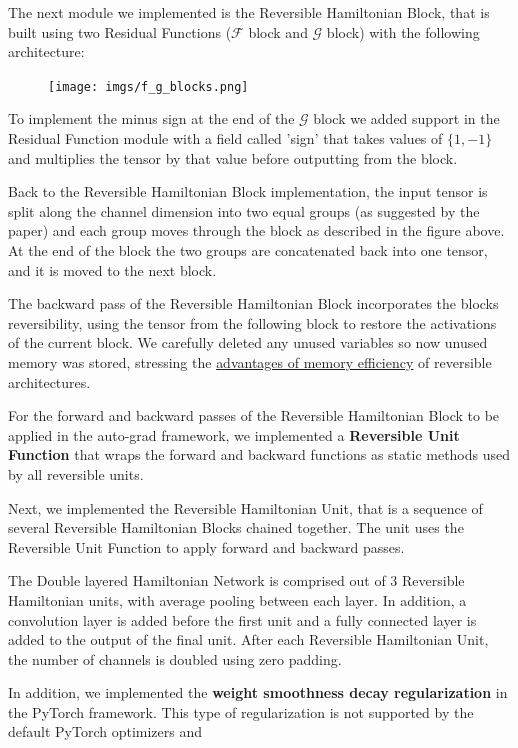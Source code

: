 \documentclass{article}
\theoremstyle{remark}
\begin{document}
The next module we implemented is the Reversible Hamiltonian Block, that is built using two Residual Functions ($\mathcal{F}$ block and $\mathcal{G}$ block) with the following architecture:
\begin{figure}[H]
    \centering
    \texttt{[image: imgs/f\_g\_blocks.png]}
\end{figure}
\par
To implement the minus sign at the end of the $\mathcal{G}$ block we added support in the Residual Function module with a field called 'sign' that takes values of $\{1,-1\}$ and multiplies 
the tensor by that value before outputting from the block. \par
Back to the Reversible Hamiltonian Block implementation, the input tensor is split along the channel dimension into two equal groups (as suggested by the paper) and each group moves 
through the block as described in the figure above. At the end of the block the two groups are concatenated back into one tensor, and it is moved to the next block. \par
The backward pass of the Reversible Hamiltonian Block incorporates the blocks reversibility, using the tensor from the following block to restore the activations of the current block. 
We carefully deleted any unused variables so now unused memory was stored, stressing the \underline{advantages of memory efficiency} of reversible architectures.\par
For the forward and backward passes of the Reversible Hamiltonian Block to be applied in the auto-grad framework, we implemented a \textbf{Reversible Unit Function} that wraps the forward and 
backward functions as static methods used by all reversible units.\par
Next, we implemented the Reversible Hamiltonian Unit, that is a sequence of several Reversible Hamiltonian Blocks chained together. The unit uses the Reversible Unit Function to apply 
forward and backward passes. \par
The Double layered Hamiltonian Network is comprised out of 3 Reversible Hamiltonian units, with average pooling between each layer. In addition, a convolution layer is added before the 
first unit and a fully connected layer is added to the output of the final unit. After each Reversible Hamiltonian Unit, the number of channels is doubled using zero padding. \par
In addition, we implemented the \textbf{weight smoothness decay regularization} in the PyTorch framework. This type of regularization is not supported by the default PyTorch optimizers and 
\end{document}

